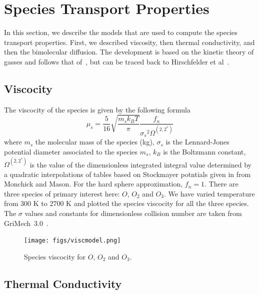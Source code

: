 \section{Species Transport Properties}\label{sec:species-trans}

In this section, we describe the models that are used to compute the
species transport properties. First, we described viscosity, then
thermal conductivity, and then the bimolecular diffusion. The
development is based on the kinetic theory of gasses and follows that of~\cite{Kee}, but can be traced back to
Hirschfelder et al~\cite{Curtiss}.

\subsection{Viscocity}
The viscocity of the species is given by the following formula
\begin{equation}
\mu_s = \frac{5}{16}\sqrt{\frac{m_s k_B T}{\pi}}\frac{f_n}{{\sigma_s}^2   \Omega^{(2,2^*)}}
\end{equation}
%
where $m_s$ the molecular mass of the species (kg), $\sigma_s$ is the
Lennard-Jones potential diameter associated to the species $m_s$,
$k_B$ is the Boltzmann constant, $\Omega^{(2,2^*)}$ is the value of
the dimensionless integrated integral value determined by a quadratic
interpolations of tables based on Stockmayer potntials given in from
Monchick and Mason\cite{Monchick}. For the hard sphere approximation,
$f_n = 1$.  There are three species of primary interest here: $O$,
$O_2$ and $O_3$. We have varied temperature from 300 K to 2700 K and
plotted the species viscocity for all the three species. The $\sigma$
values and constants for dimensionless collision number are taken from
GriMech~3.0~\cite{gri}.
\begin{figure}[H]
  \centering
  \texttt{[image: figs/viscmodel.png]}
   \caption{Species viscocity for $O$, $O_2$ and $O_3$.}
\end{figure}


\subsection{Thermal Conductivity}

